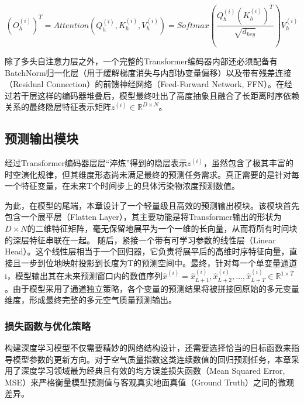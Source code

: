 \begin{equation}\label{eq:time_attention}
(O_h^{(i)})^T = Attention(Q_h^{(i)}, K_h^{(i)}, V_h^{(i)}) = {Softmax}\left(\frac{Q_h^{(i)} (K_h^{(i)})^T}{\sqrt{d_{key}}}\right) V_h^{(i)}
\end{equation}

除了多头自注意力层之外，一个完整的Transformer编码器内部还必须配备有BatchNorm归一化层（用于缓解梯度消失与内部协变量偏移）以及带有残差连接（Residual Connection）的前馈神经网络（Feed-Forward Network, FFN）。在经过若干层这样的编码器堆叠后，模型最终吐出了高度抽象且融合了长距离时序依赖关系的最终隐层特征表示矩阵$z^{(i)} \in \mathbb{R}^{D \times N}$。

\subsection{预测输出模块}


经过Transformer编码器层层“淬炼”得到的隐层表示$z^{(i)}$，虽然包含了极其丰富的时空演化规律，但其维度形态尚未满足最终的预测任务需求。真正需要的是针对每一个特征变量，在未来T个时间步上的具体污染物浓度预测数值。

为此，在模型的尾端，本章设计了一个轻量级且高效的预测输出模块。该模块首先包含一个展平层（Flatten Layer），其主要功能是将Transformer输出的形状为$D \times N$的二维特征矩阵，毫无保留地展平为一个一维的长向量，从而将所有时间块的深层特征串联在一起。
随后，紧接一个带有可学习参数的线性层（Linear Head）。这个线性层相当于一个回归器，它负责将展平后的高维时序特征向量，直接且一步到位地映射投影到长度为T的预测空间中。最终，针对每一个单变量通道i，模型输出其在未来预测窗口内的数值序列$\hat{x}^{(i)}=\hat{x}^{(i)}_{L+1},\hat{x}^{(i)}_{L+2},\ldots,\hat{x}^{(i)}_{L+T}\in\mathbb{R}^{1\times T}$。由于模型采用了通道独立策略，各个变量的预测结果将被拼接回原始的多元变量维度，形成最终完整的多元空气质量预测输出。

\subsubsection{损失函数与优化策略}


构建深度学习模型不仅需要精妙的网络结构设计，还需要选择恰当的目标函数来指导模型参数的更新方向。对于空气质量指数这类连续数值的回归预测任务，本章采用了深度学习领域最为经典且有效的均方误差损失函数（Mean Squared Error, MSE）来严格衡量模型预测值与客观真实地面真值（Ground Truth）之间的微观差异。

